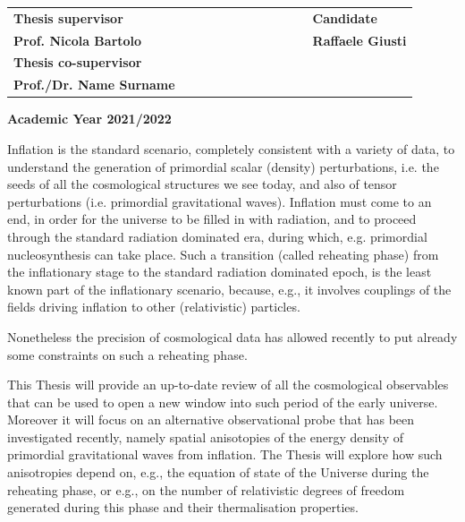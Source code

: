 \documentclass[11pt,a4paper,twoside]{book}
\newenvironment{abstract}{\cleardoublepage\thispagestyle{empty}\null\vfill\begin{center}\bfseries\abstractname\end{center}}{\vfill\null}
\begin{document}
\begin{titlepage}
		\vspace{20mm}
		\begin{spacing}{2}
			\begin{tabular}{ l  c  c c c  cc c c c c  l }
				{\Large{\bf Thesis supervisor}} &&&&&&&&&&& {\Large{\bf Candidate}}\\
				{\Large{\bf Prof. Nicola Bartolo}} &&&&&&&&&&& {\Large{\bf Raffaele Giusti}}\\
				{\Large{\bf Thesis co-supervisor}}\\
				{\Large{\bf Prof./Dr. Name Surname}}\\
			\end{tabular}
		\end{spacing}
		\vspace{15 mm}
		
		\begin{center}
			{\Large{\bf Academic Year 2021/2022}}
		\end{center}
	\end{titlepage}
	\clearpage{\pagestyle{empty}\cleardoublepage}

\begin{abstract}
	Inflation is the standard scenario, completely consistent with a variety of data, to understand the  
	generation of primordial scalar (density) perturbations, i.e.  the seeds of all the cosmological structures we  
	see today, and also of tensor perturbations (i.e. primordial gravitational waves). Inflation must come to an  
	end, in order for the universe to be filled in with radiation, and to proceed  through the standard radiation  
	dominated era, during which, e.g. primordial nucleosynthesis can take place. Such a transition (called  
	reheating phase) from the inflationary stage to the standard radiation dominated epoch, is the least known  
	part of the inflationary scenario, because, e.g., it involves couplings of the fields driving inflation to other  
	(relativistic) particles.  
	
	Nonetheless the precision of cosmological data has allowed recently to put already some constraints on  
	such a reheating phase.  
	
	This Thesis will provide an up-to-date review of all the cosmological observables that can be used to open  
	a new window into such period of the early universe. Moreover it will focus on an alternative observational  
	probe that has been investigated recently, namely spatial anisotopies of the energy density of primordial  
	gravitational waves from inflation. The Thesis will explore how such anisotropies depend on, e.g., the  
	equation of state of the Universe during the reheating phase, or e.g., on the number of relativistic degrees  
	of freedom generated during this phase and their thermalisation properties.
\end{abstract}
	
\end{document}
